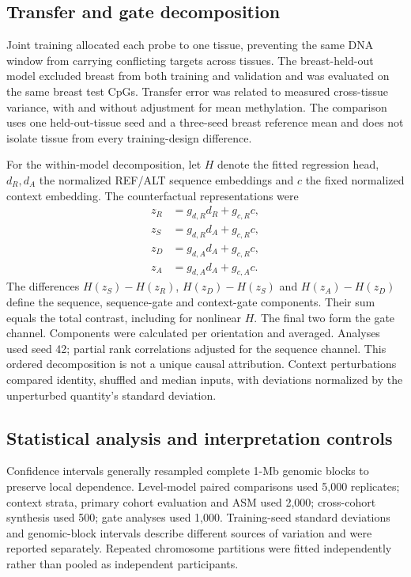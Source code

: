 \documentclass[11pt,letterpaper,twocolumn]{article}
\begin{document}
\subsection{Transfer and gate decomposition}
Joint training allocated each probe to one tissue, preventing the same DNA window from carrying conflicting targets across tissues. The breast-held-out model excluded breast from both training and validation and was evaluated on the same breast test CpGs. Transfer error was related to measured cross-tissue variance, with and without adjustment for mean methylation. The comparison uses one held-out-tissue seed and a three-seed breast reference mean and does not isolate tissue from every training-design difference.

For the within-model decomposition, let $H$ denote the fitted regression head, $d_R,d_A$ the normalized REF/ALT sequence embeddings and $c$ the fixed normalized context embedding. The counterfactual representations were
\begin{align*}
z_R&=g_{d,R}d_R+g_{c,R}c,\\
z_S&=g_{d,R}d_A+g_{c,R}c,\\
z_D&=g_{d,A}d_A+g_{c,R}c,\\
z_A&=g_{d,A}d_A+g_{c,A}c.
\end{align*}
The differences $H(z_S)-H(z_R)$, $H(z_D)-H(z_S)$ and $H(z_A)-H(z_D)$ define the sequence, sequence-gate and context-gate components. Their sum equals the total contrast, including for nonlinear $H$. The final two form the gate channel. Components were calculated per orientation and averaged. Analyses used seed 42; partial rank correlations adjusted for the sequence channel. This ordered decomposition is not a unique causal attribution. Context perturbations compared identity, shuffled and median inputs, with deviations normalized by the unperturbed quantity's standard deviation.

\subsection{Statistical analysis and interpretation controls}
Confidence intervals generally resampled complete 1-Mb genomic blocks to preserve local dependence. Level-model paired comparisons used 5,000 replicates; context strata, primary cohort evaluation and ASM used 2,000; cross-cohort synthesis used 500; gate analyses used 1,000. Training-seed standard deviations and genomic-block intervals describe different sources of variation and were reported separately. Repeated chromosome partitions were fitted independently rather than pooled as independent participants.
\end{document}
